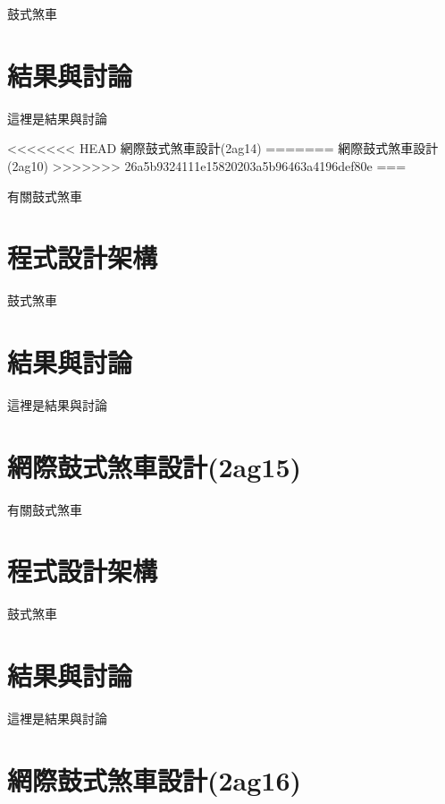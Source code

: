 \documentclass[]{article}
\begin{document}
鼓式煞車

\section{結果與討論}\label{ux7d50ux679cux8207ux8a0eux8ad6-9}

這裡是結果與討論

\textless{}\textless{}\textless{}\textless{}\textless{}\textless{}\textless{}
HEAD 網際鼓式煞車設計(2ag14) ======= 網際鼓式煞車設計(2ag10)
\textgreater{}\textgreater{}\textgreater{}\textgreater{}\textgreater{}\textgreater{}\textgreater{}
26a5b9324111e15820203a5b96463a4196def80e ===

有關鼓式煞車

\section{程式設計架構}\label{ux7a0bux5f0fux8a2dux8a08ux67b6ux69cb-10}

鼓式煞車

\section{結果與討論}\label{ux7d50ux679cux8207ux8a0eux8ad6-10}

這裡是結果與討論

\section{網際鼓式煞車設計(2ag15)}\label{ux7db2ux969bux9f13ux5f0fux715eux8ecaux8a2dux8a082ag15}

有關鼓式煞車

\section{程式設計架構}\label{ux7a0bux5f0fux8a2dux8a08ux67b6ux69cb-11}

鼓式煞車

\section{結果與討論}\label{ux7d50ux679cux8207ux8a0eux8ad6-11}

這裡是結果與討論

\section{網際鼓式煞車設計(2ag16)}\label{ux7db2ux969bux9f13ux5f0fux715eux8ecaux8a2dux8a082ag16}
\end{document}
